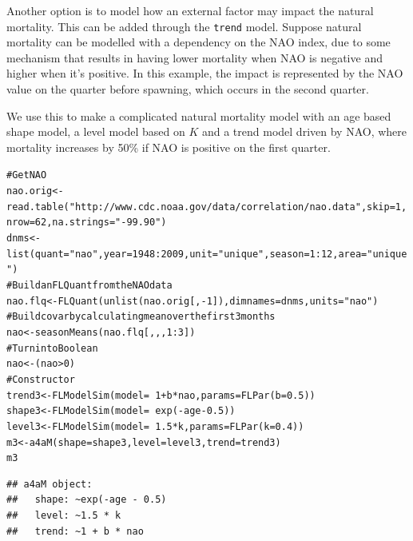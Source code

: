 \documentclass[a4paper,english,10pt]{article}\usepackage[]{graphicx}\usepackage[]{color}
\makeatletter
\newcommand{\hlnum}[1]{\textcolor[rgb]{0.2,0.2,0.2}{#1}}%
\newcommand{\hlstr}[1]{\textcolor[rgb]{0.2,0.2,0.2}{#1}}%
\newcommand{\hlcom}[1]{\textcolor[rgb]{0.2,0.267,0.4}{#1}}%
\newcommand{\hlopt}[1]{\textcolor[rgb]{0.2,0.2,0.2}{#1}}%
\newcommand{\hlstd}[1]{\textcolor[rgb]{0,0,0}{#1}}%
\newcommand{\hlkwb}[1]{\textcolor[rgb]{0.361,0.506,0.596}{#1}}%
\newcommand{\hlkwc}[1]{\textcolor[rgb]{0.361,0.506,0.596}{#1}}%
\newcommand{\hlkwd}[1]{\textcolor[rgb]{0.361,0.506,0.596}{#1}}%
\newenvironment{kframe}{%
 \def\at@end@of@kframe{}%
 \ifinner\ifhmode%
  \def\at@end@of@kframe{\end{minipage}}%
  \begin{minipage}{\columnwidth}%
 \fi\fi%
 \def\FrameCommand##1{\hskip\@totalleftmargin \hskip-\fboxsep
 \colorbox{shadecolor}{##1}\hskip-\fboxsep
     \hskip-\linewidth \hskip-\@totalleftmargin \hskip\columnwidth}%
 \MakeFramed {\advance\hsize-\width
   \@totalleftmargin\z@ \linewidth\hsize
   \@setminipage}}%
 {\par\unskip\endMakeFramed%
 \at@end@of@kframe}
\newenvironment{knitrout}{}{} %
\newcommand{\code}[1]{{\texttt{#1}}}
\makeatother
\begin{document}
Another option is to model how an external factor may impact the natural mortality. This can be added through the \code{trend} model. Suppose natural mortality can be modelled with a dependency on the NAO index, due to some mechanism that results in having lower mortality when NAO is negative and higher when it's positive. In this example, the impact is represented by the NAO value on the quarter before spawning, which occurs in the second quarter. 

We use this to make a complicated natural mortality model with an age based shape model, a level model based on $K$ and a trend model driven by NAO, where mortality increases by 50\% if NAO is positive on the first quarter.

\begin{knitrout}
\color{fgcolor}\begin{kframe}
\begin{alltt}
\hlcom{# Get NAO}
\hlstd{nao.orig} \hlkwb{<-} \hlkwd{read.table}\hlstd{(}\hlstr{"http://www.cdc.noaa.gov/data/correlation/nao.data"}\hlstd{,} \hlkwc{skip}\hlstd{=}\hlnum{1}\hlstd{,} \hlkwc{nrow}\hlstd{=}\hlnum{62}\hlstd{,} \hlkwc{na.strings}\hlstd{=}\hlstr{"-99.90"}\hlstd{)}
\hlstd{dnms} \hlkwb{<-} \hlkwd{list}\hlstd{(}\hlkwc{quant}\hlstd{=}\hlstr{"nao"}\hlstd{,} \hlkwc{year}\hlstd{=}\hlnum{1948}\hlopt{:}\hlnum{2009}\hlstd{,} \hlkwc{unit}\hlstd{=}\hlstr{"unique"}\hlstd{,} \hlkwc{season}\hlstd{=}\hlnum{1}\hlopt{:}\hlnum{12}\hlstd{,} \hlkwc{area}\hlstd{=}\hlstr{"unique"}\hlstd{)}
\hlcom{# Build an FLQuant from the NAO data}
\hlstd{nao.flq} \hlkwb{<-} \hlkwd{FLQuant}\hlstd{(}\hlkwd{unlist}\hlstd{(nao.orig[,}\hlopt{-}\hlnum{1}\hlstd{]),} \hlkwc{dimnames}\hlstd{=dnms,} \hlkwc{units}\hlstd{=}\hlstr{"nao"}\hlstd{)}
\hlcom{# Build covar by calculating mean over the first 3 months}
\hlstd{nao} \hlkwb{<-} \hlkwd{seasonMeans}\hlstd{(nao.flq[,,,}\hlnum{1}\hlopt{:}\hlnum{3}\hlstd{])}
\hlcom{# Turn into Boolean}
\hlstd{nao} \hlkwb{<-} \hlstd{(nao}\hlopt{>}\hlnum{0}\hlstd{)}
\hlcom{# Constructor}
\hlstd{trend3} \hlkwb{<-} \hlkwd{FLModelSim}\hlstd{(}\hlkwc{model}\hlstd{=}\hlopt{~}\hlnum{1}\hlopt{+}\hlstd{b}\hlopt{*}\hlstd{nao,} \hlkwc{params}\hlstd{=}\hlkwd{FLPar}\hlstd{(}\hlkwc{b}\hlstd{=}\hlnum{0.5}\hlstd{))}
\hlstd{shape3} \hlkwb{<-} \hlkwd{FLModelSim}\hlstd{(}\hlkwc{model}\hlstd{=}\hlopt{~}\hlkwd{exp}\hlstd{(}\hlopt{-}\hlstd{age}\hlopt{-}\hlnum{0.5}\hlstd{))}
\hlstd{level3} \hlkwb{<-} \hlkwd{FLModelSim}\hlstd{(}\hlkwc{model}\hlstd{=}\hlopt{~}\hlnum{1.5}\hlopt{*}\hlstd{k,} \hlkwc{params}\hlstd{=}\hlkwd{FLPar}\hlstd{(}\hlkwc{k}\hlstd{=}\hlnum{0.4}\hlstd{))}
\hlstd{m3} \hlkwb{<-} \hlkwd{a4aM}\hlstd{(}\hlkwc{shape}\hlstd{=shape3,} \hlkwc{level}\hlstd{=level3,} \hlkwc{trend}\hlstd{=trend3)}
\hlstd{m3}
\end{alltt}
\begin{verbatim}
## a4aM object:
##   shape: ~exp(-age - 0.5)
##   level: ~1.5 * k
##   trend: ~1 + b * nao
\end{verbatim}
\end{kframe}
\end{knitrout}
\end{document}
